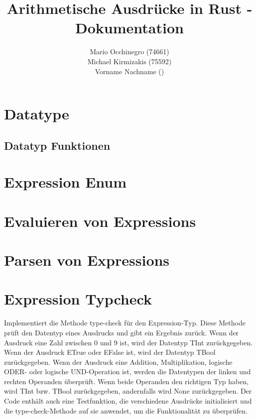 \documentclass[a4paper, 1ppt]{article}
\title{Arithmetische Ausdrücke in Rust - Dokumentation}
\date{}
\author{
		Mario Occhinegro (74661)\\
		Michael Kirmizakis (75592)\\
		Vorname Nachname ()\\
}
\begin{document}
\nocite{*}
\maketitle
\newpage
\clearpage
\tableofcontents
\setcounter{page}{1}
\newpage
{}
\maketitle
\section{Datatype}
\subsection{Datatyp Funktionen}
\section{Expression Enum}
\section{Evaluieren von Expressions}
\section{Parsen von Expressions}
\section{Expression Typcheck}
Implementiert die Methode type-check für den Expression-Typ.
Diese Methode prüft den Datentyp eines Ausdrucks und gibt ein Ergebnis zurück.
Wenn der Ausdruck eine Zahl zwischen 0 und 9 ist, wird der Datentyp TInt zurückgegeben.
Wenn der Ausdruck ETrue oder EFalse ist, wird der Datentyp TBool zurückgegeben.
Wenn der Ausdruck eine Addition, Multiplikation, logische ODER- oder logische UND-Operation ist, werden die Datentypen der linken und rechten Operanden überprüft.
Wenn beide Operanden den richtigen Typ haben, wird TInt bzw.
TBool zurückgegeben, andernfalls wird None zurückgegeben.
Der Code enthält auch eine Testfunktion, die verschiedene Ausdrücke initialisiert und die type-check-Methode auf sie anwendet, um die Funktionalität zu überprüfen.
\end{document}
